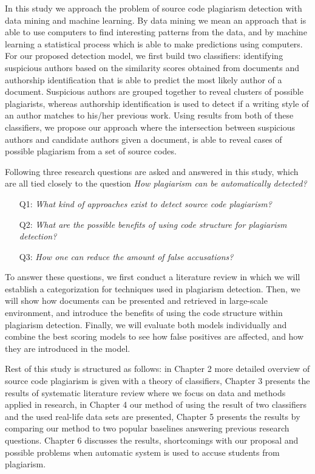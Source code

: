 \documentclass[english, grading]{tktltiki2}
\theoremstyle{definition}
\theoremstyle{remark}
\numberwithin{equation}{section} %
\begin{document}
In this study we approach the problem of source code plagiarism detection with data mining and machine learning. By data mining we mean an approach that is able to use computers to find interesting patterns from the data, and by machine learning a statistical process which is able to make predictions using computers. For our proposed detection model, we first build two classifiers: identifying suspicious authors based on the similarity scores obtained from documents and authorship identification that is able to predict the most likely author of a document. Suspicious authors are grouped together to reveal clusters of possible plagiarists, whereas authorship identification is used to detect if a writing style of an author matches to his/her previous work. Using results from both of these classifiers, we propose our approach where the intersection between suspicious authors and candidate authors given a document, is able to reveal cases of possible plagiarism from a set of source codes.

Following three research questions are asked and answered in this study, which are all tied closely to the question \emph{How plagiarism can be automatically detected?}

\begin{itemize}
    \item[Q1:] \emph{What kind of approaches exist to detect source code plagiarism?}
    \item[Q2:] \emph{What are the possible benefits of using code structure for plagiarism detection?}
    \item[Q3:] \emph{How one can reduce the amount of false accusations?}
\end{itemize}

\noindent
To answer these questions, we first conduct a literature review in which we will establish a categorization for techniques used in plagiarism detection. Then, we will show how documents can be presented and retrieved in large-scale environment, and introduce the benefits of using the code structure within plagiarism detection. Finally, we will evaluate both models individually and combine the best scoring models to see how false positives are affected, and how they are introduced in the model. 

Rest of this study is structured as follows: in Chapter 2 more detailed overview of source code plagiarism is given with a theory of classifiers, Chapter 3 presents the results of systematic literature review where we focus on data and methods applied in research, in Chapter 4 our method of using the result of two classifiers and the used real-life data sets are presented, Chapter 5 presents the results by comparing our method to two popular baselines answering previous research questions. Chapter 6 discusses the results, shortcomings with our proposal and possible problems when automatic system is used to accuse students from plagiarism. 
\end{document}
